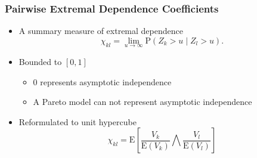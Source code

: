 \documentclass[aspectratio=169]{beamer}
\begin{document}
\begin{frame}
  \frametitle{Pairwise Extremal Dependence Coefficients}
    \begin{itemize}
      \item A summary measure of extremal dependence
      \begin{equation*}
        \chi_{kl} = \lim\limits_{u\to\infty}\text{P}\left(Z_k > u\mid Z_l > u\right).
      \end{equation*}
      \pause
      \item Bounded to $[0,1]$
        \begin{itemize}
          \item $0$ represents asymptotic independence
          \item A Pareto model can not represent asymptotic independence
        \end{itemize}
      \pause
      \item Reformulated to unit hypercube
        \begin{equation*}
          \chi_{kl} = \text{E}\left[\frac{V_k}{\text{E}(V_k)}{\bigwedge}\frac{V_l}{\text{E}(V_l)}\right]
        \end{equation*}
    \end{itemize}
\end{frame}
\end{document}

